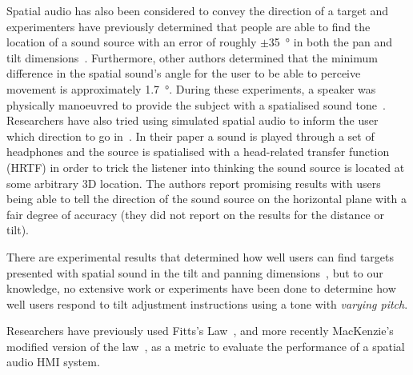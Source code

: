 \documentclass[format=sigconf, review=true, screen=true, anonymous=true]{acmart}
\begin{document}
Spatial audio has also been considered to convey the direction of a target and experimenters have previously determined that people are able to find the location of a sound source with an error of roughly $\pm$\SI{35}{\degree} in both the pan and tilt dimensions~\cite{zwiers2001spatial}. Furthermore, other authors determined that the minimum difference in the spatial sound's angle for the user to be able to perceive movement is approximately \SI{1.7}{\degree}. During these experiments, a speaker was physically manoeuvred to provide the subject with a spatialised sound tone~\cite{ashmead1998spatial}. Researchers have also tried using simulated spatial audio to inform the user which direction to go in~\cite{holland2002audiogps}. In their paper a sound is played through a set of headphones and the source is spatialised with a head-related transfer function (HRTF) in order to trick the listener into thinking the sound source is located at some arbitrary 3D location. The authors report promising results with users being able to tell the direction of the sound source on the horizontal plane with a fair degree of accuracy (they did not report on the results for the distance or tilt). %

There are experimental results that determined how well users can find targets presented with spatial sound in the tilt and panning dimensions~\cite{katz2011spatial, zwiers2001spatial}, but to our knowledge, no extensive work or experiments have been done to determine how well users respond to tilt adjustment instructions using a tone with \emph{varying pitch}. %

Researchers have previously used Fitts's Law~\cite{fitts1954information}, and more recently MacKenzie's modified version of the law~\cite{mackenzie1992fitts}, as a metric to evaluate the performance of a spatial audio HMI system. %

\end{document}
